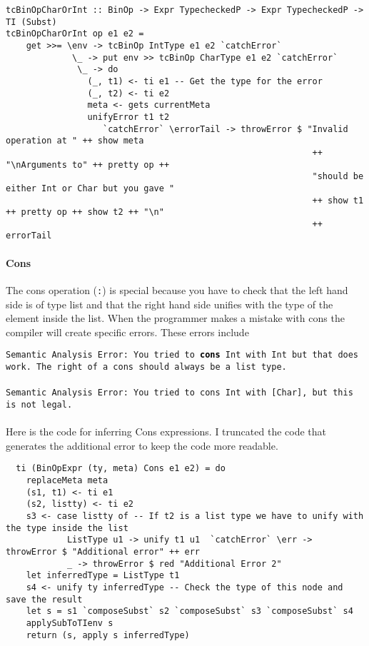 \documentclass{report}
\begin{document}
\begin{verbatim}
tcBinOpCharOrInt :: BinOp -> Expr TypecheckedP -> Expr TypecheckedP -> TI (Subst)
tcBinOpCharOrInt op e1 e2 = 
    get >>= \env -> tcBinOp IntType e1 e2 `catchError`
             \_ -> put env >> tcBinOp CharType e1 e2 `catchError`
              \_ -> do
                (_, t1) <- ti e1 -- Get the type for the error
                (_, t2) <- ti e2
                meta <- gets currentMeta
                unifyError t1 t2 
                   `catchError` \errorTail -> throwError $ "Invalid operation at " ++ show meta 
                                                            ++ "\nArguments to" ++ pretty op ++
                                                            "should be either Int or Char but you gave " 
                                                            ++ show t1 ++ pretty op ++ show t2 ++ "\n" 
                                                            ++ errorTail
\end{verbatim}


\paragraph{Cons} The cons operation (\texttt{:}) is special because you have to check that the left hand side is of type list and that the right hand side unifies with the type of the element inside the list. When the programmer makes a mistake with cons the compiler will create specific errors.
These errors include

\noindent\texttt{\textcolor{error}{Semantic Analysis Error: You tried to \textcolor{black}{\textbf{cons}} \textcolor{type}{Int} with} \textcolor{type}{Int} but that does work. The right of a cons should always be a list type.}
\\\\
\noindent\texttt{\textcolor{error}{Semantic Analysis Error: You tried to cons \textcolor{type}{Int} with \textcolor{type}{[Char]}}, but this is not legal.}
\\\\
\noindent Here is the code for inferring Cons expressions. I truncated the code that generates the additional error to keep the code more readable. 

\begin{verbatim}
  ti (BinOpExpr (ty, meta) Cons e1 e2) = do
    replaceMeta meta
    (s1, t1) <- ti e1
    (s2, listty) <- ti e2
    s3 <- case listty of -- If t2 is a list type we have to unify with the type inside the list
            ListType u1 -> unify t1 u1  `catchError` \err -> throwError $ "Additional error" ++ err
            _ -> throwError $ red "Additional Error 2"
    let inferredType = ListType t1
    s4 <- unify ty inferredType -- Check the type of this node and save the result
    let s = s1 `composeSubst` s2 `composeSubst` s3 `composeSubst` s4
    applySubToTIenv s
    return (s, apply s inferredType)
\end{verbatim}
\end{document}
